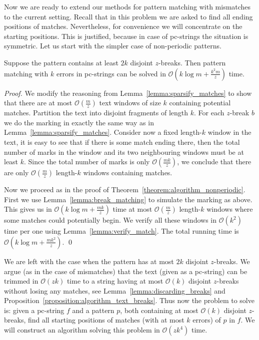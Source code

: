 \documentclass[runningheads]{llncs}
\begin{document}
Now we are ready to extend our methods for pattern matching with mismatches to the current setting. Recall that in this problem we are asked to find all ending positions of matches. Nevertheless, for convenience we will concentrate on the starting positions. This is justified, because in case of pc-strings the situation is symmetric. Let us start with the simpler case of non-periodic patterns.
\begin{theorem}\label{theorem:algorithm_errors_nonperiodic}
Suppose the pattern contains at least $2k$ disjoint $z$-breaks. Then pattern matching with $k$ errors in pc-strings can be solved in $\mathcal{O}(k\log m+\frac{k^2m}{z})$ time.
\end{theorem}
\begin{proof}
We modify the reasoning from Lemma~\ref{lemma:sparsify_matches} to show that there are at most $\mathcal{O}(\frac{m}{z})$ text windows of size $k$ containing potential matches. Partition the text into disjoint fragments of length $k$. For each $z$-break $b$ we do the marking in exactly the same way as in Lemma~\ref{lemma:sparsify_matches}. Consider now a fixed length-$k$ window in the text, it is easy to see that if there is some match ending there, then the total number of marks in the window and its two neighbouring windows must be at least $k$. Since the total number of marks is only $\mathcal{O}(\frac{mk}{z})$, we conclude that there are only $\mathcal{O}(\frac{m}{z})$ length-$k$ windows containing matches. 

Now we proceed as in the proof of Theorem~\ref{theorem:algorithm_nonperiodic}. First we use Lemma~\ref{lemma:break_matching} to simulate the marking as above. This gives us in $\mathcal{O}(k\log m+\frac{mk}{z})$ time at most $\mathcal{O}(\frac{m}{z})$ length-$k$ windows where some matches could potentially begin. We verify all these windows in $\mathcal{O}(k^2)$ time per one using Lemma~\ref{lemma:verify_match}. The total running time is $\mathcal{O}(k\log m+\frac{mk^2}{z})$. 
\qed
\end{proof}

We are left with the case when the pattern has at most $2k$ disjoint $z$-breaks. We argue (as in the case of mismatches) that the text (given as a pc-string) can be trimmed in $\mathcal{O}(zk)$ time to a string having at most $\mathcal{O}(k)$ disjoint $z$-breaks without losing any matches, see Lemma~\ref{lemma:discarding_breaks} and Proposition~\ref{proposition:algorithm_text_breaks}. Thus now the problem to solve is: given a pc-string $f$ and a pattern $p$, both containing at most $\mathcal{O}(k)$ disjoint $z$-breaks, find all starting positions of matches (with at most $k$ errors) of $p$ in $f$. We will construct an algorithm solving this problem in $\mathcal{O}(zk^4)$ time.
\end{document}
